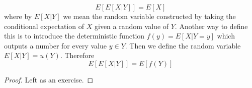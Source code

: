 \begin{enumerate}
   \begin{equation*}
   E[E[X|Y]] = E[X]
   \end{equation*}
   where by $E[X|Y]$ we mean the random variable constructed by taking the conditional expectation of $X$ given a random value of $Y$. Another way to define this is to introduce the deterministic function  $f(y) = E[X|Y=y]$ which outputs a number for every value $y \in Y$. Then we define the random variable $E[X|Y] = u(Y)$.  Therefore
   \begin{equation*}
   E[E[X|Y]]  = E[f(Y)] 
   \end{equation*}
   \begin{proof}
   Left as an exercise. 
   \end{proof}
  \end{enumerate}

  
  

